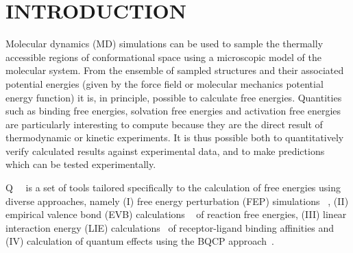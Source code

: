 \documentclass[a4paper,11pt]{article}
\let\origcite\cite
\def\cite#1{\unskip~\origcite{#1}}
\begin{document}






\section{INTRODUCTION} 
Molecular  dynamics  (MD)  simulations  can  be  used  to  sample  the
thermally   accessible  regions   of  conformational   space  using a
microscopic model of the molecular system.  From the ensemble of sampled
structures and their associated potential energies (given by the force
field  or molecular  mechanics potential  energy function)  it is,  in
principle, possible  to calculate  free energies.  Quantities  such as
binding  free energies,  solvation free  energies and  activation free
energies are  particularly interesting  to compute because  they are
the direct result of thermodynamic  or kinetic experiments. It is thus
possible  both to  quantitatively  verify  calculated results  against
experimental  data,  and  to  make  predictions  which  can  be  tested
experimentally.

Q~\cite{Marelius1998} is a set of tools tailored specifically to the
calculation of free energies using diverse approaches, namely
(I)      free      energy     perturbation      (FEP)      simulations
\cite{Kollman1993,Beveridge1989}, (II) empirical  valence bond (EVB)
calculations   \cite{Warshel1997,Aqvist1993}   of   reaction   free
energies, (III)    linear    interaction     energy    (LIE)
calculations\cite{Aqvist1994,Jones-Hertzog1997,Hansson1998}     of
receptor-ligand binding affinities and (IV) calculation of quantum effects
using the BQCP approach\cite{Major2007a,Gao2008}.
\end{document}
